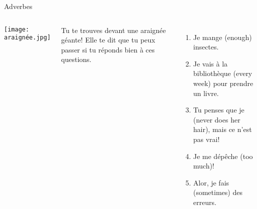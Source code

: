 \documentclass{beamer}
\begin{document}
  \begin{frame}{Adverbes}
    \hypertarget{adverbes}{}
    \begin{columns}
        \begin{center}
          \texttt{[image: araignée.jpg]}
        \end{center}
        Tu te trouves devant une araignée géante!
        Elle te dit que tu peux passer si tu réponds bien à ces questions.
      \begin{enumerate}
        \item Je mange \underline{} (enough) insectes.
        \item Je vais à la bibliothèque \underline{} (every week) pour prendre un livre.
        \item Tu penses que je \underline{} (never does her hair), mais ce n'est pas vrai!
        \item Je me dépêche \underline{} (too much)!
        \item Alor, je fais \underline{} (sometimes) des erreurs.
      \end{enumerate}
    \end{columns}
  \end{frame}
\end{document}
